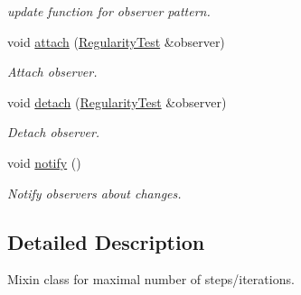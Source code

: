 \begin{DoxyCompactItemize}
\begin{DoxyCompactList}\small\item\em update function for observer pattern. \end{DoxyCompactList}\item 
\hypertarget{classSpacy_1_1Mixin_1_1MixinConnection_abb5520ee6b22dd993d78f142939a1ed4}{void \hyperlink{classSpacy_1_1Mixin_1_1MixinConnection_abb5520ee6b22dd993d78f142939a1ed4}{attach} (\hyperlink{classSpacy_1_1Mixin_1_1RegularityTest}{Regularity\-Test} \&observer)}\label{classSpacy_1_1Mixin_1_1MixinConnection_abb5520ee6b22dd993d78f142939a1ed4}

\begin{DoxyCompactList}\small\item\em Attach observer. \end{DoxyCompactList}\item 
\hypertarget{classSpacy_1_1Mixin_1_1MixinConnection_adda739590c487679c26f60e50aedb73f}{void \hyperlink{classSpacy_1_1Mixin_1_1MixinConnection_adda739590c487679c26f60e50aedb73f}{detach} (\hyperlink{classSpacy_1_1Mixin_1_1RegularityTest}{Regularity\-Test} \&observer)}\label{classSpacy_1_1Mixin_1_1MixinConnection_adda739590c487679c26f60e50aedb73f}

\begin{DoxyCompactList}\small\item\em Detach observer. \end{DoxyCompactList}\item 
\hypertarget{classSpacy_1_1Mixin_1_1MixinConnection_a1ddeaa78a3bb4a38c2cca36d1f99fe36}{void \hyperlink{classSpacy_1_1Mixin_1_1MixinConnection_a1ddeaa78a3bb4a38c2cca36d1f99fe36}{notify} ()}\label{classSpacy_1_1Mixin_1_1MixinConnection_a1ddeaa78a3bb4a38c2cca36d1f99fe36}

\begin{DoxyCompactList}\small\item\em Notify observers about changes. \end{DoxyCompactList}\end{DoxyCompactItemize}


\subsection{Detailed Description}
Mixin class for maximal number of steps/iterations. 

